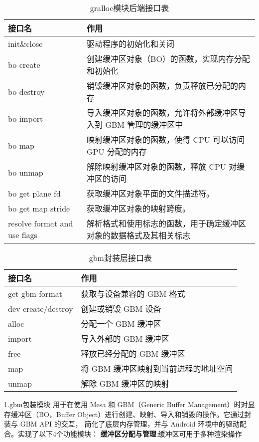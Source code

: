 \begin{table}[h]  
  \centering
  \caption{gralloc模块后端接口表}
  \label{tab:gralloc模块后端接口表}
  \begin{tabular}{ll}
    \toprule
    接口名  & 作用\\
    \midrule
    init\&close & 驱动程序的初始化和关闭 \\
    bo create & 创建缓冲区对象（BO）的函数，实现内存分配和初始化 \\
    bo destroy & 销毁缓冲区对象的函数，负责释放已分配的内存 \\
    bo import & 导入缓冲区对象的函数，允许将外部缓冲区导入到 GBM 管理的缓冲区中 \\
    bo map & 映射缓冲区对象的函数，使得 CPU 可以访问 GPU 分配的内存 \\
    bo unmap & 解除映射缓冲区对象的函数，释放 CPU 对缓冲区的访问 \\
    bo get plane fd & 获取缓冲区对象平面的文件描述符。\\
    bo get map stride & 获取缓冲区对象的映射跨度。 \\
    resolve format and use flags & 解析格式和使用标志的函数，用于确定缓冲区对象的数据格式及其相关标志 \\
    \bottomrule
  \end{tabular}
  \note{}
\end{table}

\begin{table}[h]  
  \centering
  \caption{gbm封装层接口表}
  \label{tab:gbm封装层接口表}
  \begin{tabular}{ll}
    \toprule
    接口名  & 作用\\
    \midrule
    get gbm format & 获取与设备兼容的 GBM 格式 \\
    dev create/destroy & 创建或销毁 GBM 设备 \\
    alloc & 分配一个 GBM 缓冲区 \\
    import & 导入外部的 GBM 缓冲区 \\
    free & 释放已经分配的 GBM 缓冲区 \\
    map & 将 GBM 缓冲区映射到当前进程的地址空间 \\
    unmap & 解除 GBM 缓冲区的映射 \\
    \bottomrule
  \end{tabular}
  \note{}
\end{table}


1.gbm包装模块
用于在使用 Mesa 和 GBM（Generic Buffer Management）时对显存缓冲区（BO，Buffer Object）进行创建、映射、导入和销毁的操作。它通过封装与 GBM API 的交互，
简化了底层内存管理，并与 Android 环境中的驱动配合。实现了以下4个功能模块：
\textbf{缓冲区分配与管理}:缓冲区可用于多种渲染操作

